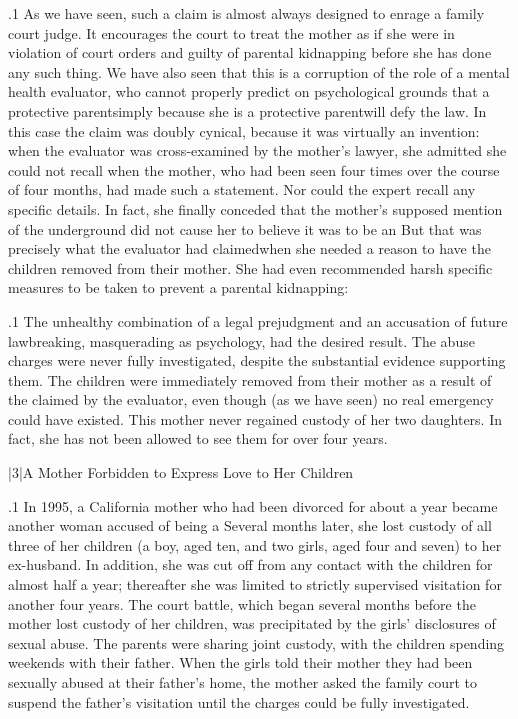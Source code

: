 \documentclass[11pt, twoside]{article}
\begin{document}
{\p.1{%
As we have seen, such a claim is almost always designed to enrage
a family court judge. It encourages the court to treat the mother as if
she were in violation of court orders and guilty of parental kidnapping
before she has done any such thing. We have also seen that this is a
corruption of the role of a mental health evaluator, who cannot properly predict on psychological grounds that a protective parent\mdash{}simply
because she is a protective parent\mdash{}will defy the law. In this case the
claim was doubly cynical, because it was virtually an invention: when the
evaluator was cross-examined by the mother’s lawyer, she admitted she
could not recall when the mother, who had been seen four times over the
course of four months, had made such a statement. Nor could the expert
recall any specific details. In fact, she finally conceded that the mother’s
supposed mention of the underground did not cause her to believe it
was  to be an  But
that was precisely what the evaluator had claimed\mdash{}when she needed a
reason to have the children removed from their mother. She had even
recommended harsh specific measures to be taken to prevent a parental
kidnapping: 
}%

\p.1{%
The unhealthy combination of a legal prejudgment and an accusation of future lawbreaking, masquerading as psychology, had the
desired result. The abuse charges were never fully investigated, despite
the substantial evidence supporting them. The children were immediately removed from their mother as a result of the 
claimed by the evaluator, even though (as we have seen) no real emergency could have existed. This mother never regained custody of her
two daughters. In fact, she has not been allowed to see them for over
four years.
}%


\s|3|{A Mother Forbidden to Express Love to Her Children}

\p.1{%
\noindent{}In 1995, a California mother who had been divorced for about a year
became another woman accused of being a  Several months later, she lost custody of all three of her children (a boy,
aged ten, and two girls, aged four and seven) to her ex-husband. In addition, she was cut off from any contact with the children for almost
half a year; thereafter she was limited to strictly supervised visitation for
another four years.
The court battle, which began several months before the mother lost
custody of her children, was precipitated by the girls’ disclosures of sexual abuse. The parents were sharing joint custody, with the children
spending weekends with their father. When the girls told their mother
they had been sexually abused at their father’s home, the mother asked
the family court to suspend the father’s visitation until the charges could
be fully investigated.
}%

}
\end{document}

